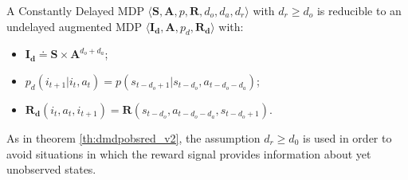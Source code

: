                 \begin{theorem}
                    \label{th:dmdpred}
                    A Constantly Delayed MDP $\langle \mathbf{S}, \mathbf{A}, p, \mathbf{R}, d_o, d_a, d_r \rangle$ with $d_r \geq d_o$ is reducible to an undelayed augmented MDP $\langle \mathbf{I_d}, \mathbf{A}, p_d, \mathbf{R_d} \rangle$ with: 
                    \begin{itemize}[topsep=0.5em, partopsep=0.5em]
                        \setlength\itemsep{0em}
                        \item $\mathbf{I_d} \doteq \mathbf{S} \times \mathbf{A}^{d_o+d_a}$;
                        \item $p_d \left( i_{t+1} | i_t, a_{t} \right) = p \left( s_{t-d_o+1} | s_{t-d_o}, a_{t-d_o-d_a} \right)$;
                        \item $\mathbf{R_d}(i_t,a_t, i_{t+1}) = \mathbf{R}(s_{t-d_{o}}, a_{t-d_o-d_a}, s_{t-d_{o}+1})$.
                    \end{itemize}
                \end{theorem}
                
                As in theorem \ref{th:dmdpobsred_v2}, the assumption $d_r \geq d_0$ is used in order to avoid situations in which the reward signal provides information about yet unobserved states. 
            
                
